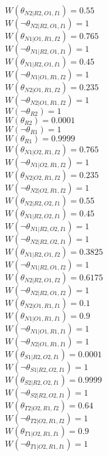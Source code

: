$W(\theta_{N2|R2,O1,I1})=0.55$\\
$W(\neg\theta_{N2|R2,O1,I1})=1$\\
$W(\theta_{N1|O1,R1,I2})=0.765$\\
$W(\neg\theta_{N1|R2,O1,I1})=1$\\
$W(\theta_{N1|R2,O1,I1})=0.45$\\
$W(\neg\theta_{N1|O1,R1,I2})=1$\\
$W(\theta_{N2|O1,R1,I2})=0.235$\\
$W(\neg\theta_{N2|O1,R1,I2})=1$\\
$W(\neg\theta_{R2})=1$\\
$W(\theta_{R2})=0.0001$\\
$W(\neg\theta_{R1})=1$\\
$W(\theta_{R1})=0.9999$\\
$W(\theta_{N1|O2,R1,I2})=0.765$\\
$W(\neg\theta_{N1|O2,R1,I2})=1$\\
$W(\theta_{N2|O2,R1,I2})=0.235$\\
$W(\neg\theta_{N2|O2,R1,I2})=1$\\
$W(\theta_{N2|R2,O2,I1})=0.55$\\
$W(\theta_{N1|R2,O2,I1})=0.45$\\
$W(\neg\theta_{N1|R2,O2,I1})=1$\\
$W(\neg\theta_{N2|R2,O2,I1})=1$\\
$W(\theta_{N1|R2,O1,I2})=0.3825$\\
$W(\neg\theta_{N1|R2,O1,I2})=1$\\
$W(\theta_{N2|R2,O1,I2})=0.6175$\\
$W(\neg\theta_{N2|R2,O1,I2})=1$\\
$W(\theta_{N2|O1,R1,I1})=0.1$\\
$W(\theta_{N1|O1,R1,I1})=0.9$\\
$W(\neg\theta_{N1|O1,R1,I1})=1$\\
$W(\neg\theta_{N2|O1,R1,I1})=1$\\
$W(\theta_{S1|R2,O2,I1})=0.0001$\\
$W(\neg\theta_{S1|R2,O2,I1})=1$\\
$W(\theta_{S2|R2,O2,I1})=0.9999$\\
$W(\neg\theta_{S2|R2,O2,I1})=1$\\
$W(\theta_{T2|O2,R1,I2})=0.64$\\
$W(\neg\theta_{T2|O2,R1,I2})=1$\\
$W(\theta_{T1|O2,R1,I1})=0.9$\\
$W(\neg\theta_{T1|O2,R1,I1})=1$\\

